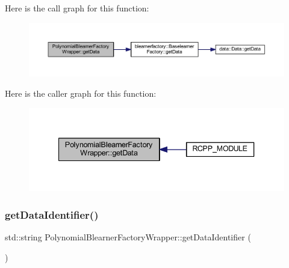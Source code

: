 Here is the call graph for this function\+:\nopagebreak
\begin{figure}[H]
\begin{center}
\leavevmode
\includegraphics[width=350pt]{class_polynomial_blearner_factory_wrapper_a7949c6384e31e69033cfe0cd96ea9746_cgraph}
\end{center}
\end{figure}
Here is the caller graph for this function\+:\nopagebreak
\begin{figure}[H]
\begin{center}
\leavevmode
\includegraphics[width=340pt]{class_polynomial_blearner_factory_wrapper_a7949c6384e31e69033cfe0cd96ea9746_icgraph}
\end{center}
\end{figure}
\mbox{\label{class_polynomial_blearner_factory_wrapper_a1711f3a9554faf63a03bf625fe39491a}} 
\subsubsection{\texorpdfstring{get\+Data\+Identifier()}{getDataIdentifier()}}
{\footnotesize\ttfamily std\+::string Polynomial\+Blearner\+Factory\+Wrapper\+::get\+Data\+Identifier (\begin{DoxyParamCaption}{ }\end{DoxyParamCaption})\hspace{0.3cm}{\ttfamily [inline]}}

